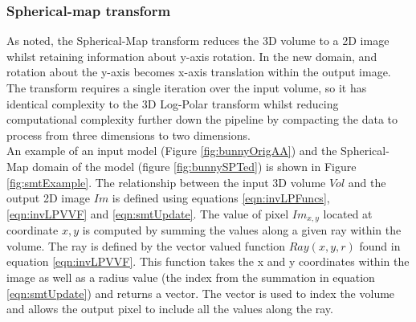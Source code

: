 \subsubsection{Spherical-map transform}
\label{SMTransform}

As noted, the Spherical-Map transform reduces the 3D volume to a 2D image whilst retaining information about y-axis rotation. In the new domain, and rotation about the y-axis becomes x-axis translation within the output image. The transform requires a single iteration over the input volume, so it has identical complexity to the 3D Log-Polar transform whilst reducing computational complexity further down the pipeline by compacting the data to process from three dimensions to two dimensions.  \\

An example of an input model (Figure \ref{fig:bunnyOrigAA}) and the Spherical-Map domain of the model (figure \ref{fig:bunnySPTed}) is shown in Figure \ref{fig:smtExample}. The relationship between the input 3D volume $Vol$ and the output 2D image $Im$ is defined using equations \ref{eqn:invLPFuncs}, \ref{eqn:invLPVVF} and \ref{eqn:smtUpdate}. The value of pixel $Im_{x,y}$ located at coordinate $x,y$ is computed by summing the values along a given ray within the volume. The ray is defined by the vector valued function $Ray(x,y,r)$ found in equation \ref{eqn:invLPVVF}. This function takes the x and y coordinates within the image as well as a radius value (the index from the summation in equation \ref{eqn:smtUpdate}) and returns a vector. The vector is used to index the volume and allows the output pixel to include all the values along the ray. \\

